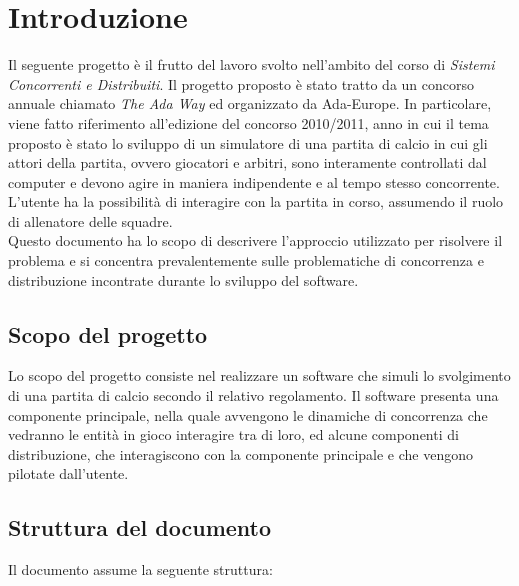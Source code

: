 
\section{Introduzione}
\label{sec:introduzione}

Il seguente progetto è il frutto del lavoro svolto nell'ambito del corso di \emph{Sistemi Concorrenti e Distribuiti}. Il progetto proposto è stato tratto da un concorso annuale chiamato \emph{The Ada Way} ed organizzato da Ada-Europe. In particolare, viene fatto riferimento all'edizione del concorso 2010/2011, anno in cui il tema proposto è stato lo sviluppo di un simulatore di una partita di calcio in cui gli attori della partita, ovvero giocatori e arbitri, sono interamente controllati dal computer e devono agire in maniera indipendente e al tempo stesso concorrente. L'utente ha la possibilità di interagire con la partita in corso, assumendo il ruolo di allenatore delle squadre.\\

Questo documento ha lo scopo di descrivere l'approccio utilizzato per risolvere il problema e si concentra prevalentemente sulle problematiche di concorrenza e distribuzione incontrate durante lo sviluppo del software.

\subsection{Scopo del progetto}
\label{sec:scopo_del_progetto}

Lo scopo del progetto consiste nel realizzare un software che simuli lo svolgimento di una partita di calcio secondo il relativo regolamento. Il software presenta una componente principale, nella quale avvengono le dinamiche di concorrenza che vedranno le entità in gioco interagire tra di loro, ed alcune componenti di distribuzione, che interagiscono con la componente principale e che vengono pilotate dall'utente.

\subsection{Struttura del documento}
\label{sec:struttura_del_documento}

Il documento assume la seguente struttura:

